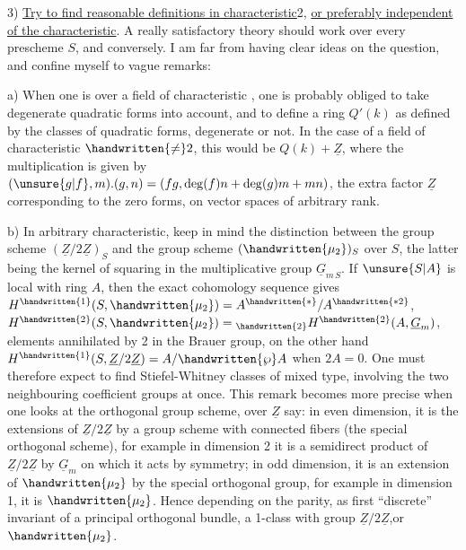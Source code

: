 3) \uline{Try to find reasonable definitions in characteristic}2, \uline{or preferably independent of the characteristic}. A really satisfactory theory should work over every prescheme $S$, and conversely. I am far from having clear ideas on the question, and confine myself to vague remarks:

a) When one is over a field of  characteristic , one is probably obliged to take degenerate quadratic forms into account, and to define a ring $Q'(k)$ as defined by the classes of quadratic forms, degenerate or not. \handwritten{[}In the case of a field of  characteristic $\handwritten{\ne}2$, this would be $Q(k)+\underline{Z}$, where the  multiplication is given by $(\unsure{g|f},m).(g,n)=(fg,\deg(f)n+\deg(g)m+mn)$, the extra factor $\underline{Z}$ corresponding to the zero forms, on vector spaces of arbitrary rank\handwritten{]}.

b) In arbitrary characteristic, keep in mind the distinction between the group scheme $(\underline{Z}/2\underline{Z})_S$ and the group scheme $(\handwritten{\mu_2})_S$ over $S$, the latter being the kernel of squaring in the multiplicative group $\underline{G}_{m\,S}$. If $\unsure{S|A}$ is local with ring $A$, then the exact cohomology sequence gives $H^{\handwritten{1}}(S,\handwritten{\mu_2})=A^{\handwritten{*}}/A^{\handwritten{*2}}$, $H^{\handwritten{2}}(S,\handwritten{\mu_2})={}_{\handwritten{2}}H^{\handwritten{2}}(A,\underline{G}_m)$, elements annihilated by 2 in the Brauer group, on the other hand $H^{\handwritten{1}}(S,\underline{Z}/2\underline{Z})=A/\handwritten{\wp}A$ when $2A=0$. One must therefore expect to find Stiefel-Whitney classes of mixed type, involving the two neighbouring coefficient groups at once. This remark becomes more precise when one looks at the orthogonal group scheme, over $\underline{Z}$ say: in even dimension, it is the extensions of $\underline{Z}/2\underline{Z}$ by a group scheme with connected fibers (the special orthogonal scheme), for example in dimension 2 it is  a semidirect product of $\underline{Z}/2\underline{Z}$ by $\underline{G}_m$ on which it acts by symmetry; in odd dimension, it is an extension of $\handwritten{\mu_2}$ by the special orthogonal group, for example in dimension 1, it is $\handwritten{\mu_2}$. Hence depending on the parity, as first ``discrete'' invariant of a principal orthogonal bundle, a 1-class with group $\underline{Z}/2\underline{Z}$,or $\handwritten{\mu_2}$.
